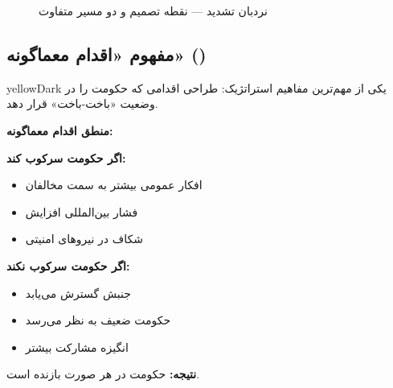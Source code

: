 \documentclass[a4paper,12pt]{article}
\begin{document}
\begin{figure}[H]
\caption{نردبان تشدید — نقطه تصمیم و دو مسیر متفاوت}
\end{figure}



\subsection{مفهوم «اقدام معماگونه» ()}

\begin{sectionbox}{yellowDark}
یکی از مهم‌ترین مفاهیم استراتژیک: طراحی اقدامی که حکومت را در وضعیت «باخت-باخت» قرار دهد.
\end{sectionbox}

\begin{notebox}[yellowPrimary]
\textbf{\textcolor{yellowPrimary}{منطق اقدام معماگونه:}}

\vspace{6pt}
\textbf{اگر حکومت سرکوب کند:}
\begin{itemize}[label=$\rightarrow$, leftmargin=15pt]
  \item افکار عمومی بیشتر به سمت مخالفان
  \item فشار بین‌المللی افزایش
  \item شکاف در نیروهای امنیتی
\end{itemize}

\textbf{اگر حکومت سرکوب نکند:}
\begin{itemize}[label=$\rightarrow$, leftmargin=15pt]
  \item جنبش گسترش می‌یابد
  \item حکومت ضعیف به نظر می‌رسد
  \item انگیزه مشارکت بیشتر
\end{itemize}

\vspace{4pt}
\textcolor{greenPrimary}{\textbf{نتیجه:}} حکومت در هر صورت بازنده است. \textcolor{greenPrimary}{\faCheckCircle}
\end{notebox}
\end{document}
